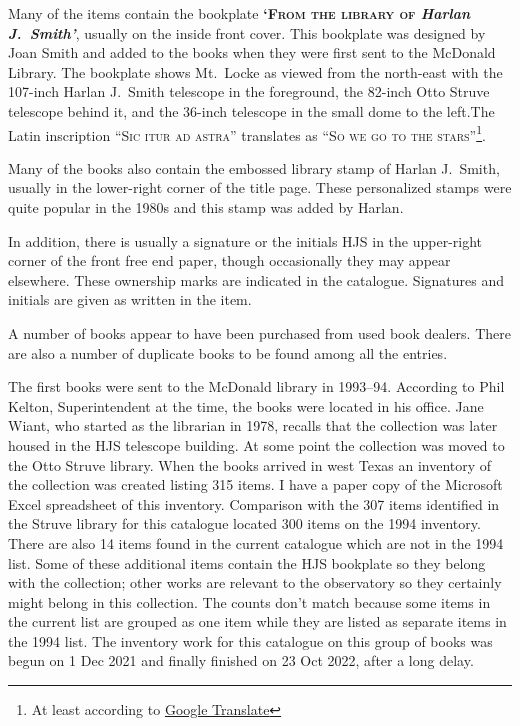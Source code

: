Many of the items contain the bookplate {\bfseries\textsc{`From the
    library of} \textit{Harlan J.~Smith'}}, usually on the inside
front cover. This bookplate was designed by Joan Smith and added to
the books when they were first sent to the McDonald Library. The
bookplate shows Mt.~Locke as viewed from the north-east with the
107-inch Harlan J.~Smith telescope in the foreground, the 82-inch Otto
Struve telescope behind it, and the 36-inch telescope in the small
dome to the left.The Latin inscription \textsc{``Sic itur ad astra''}
translates as \textsc{``So we go to the stars''}\footnote{At least
according to \href{https://translate.google.com}{Google Translate}}.

Many of the books also contain the embossed library stamp of Harlan
J.~Smith, usually in the lower-right corner of the title page. These
personalized stamps were quite popular in the 1980s and this stamp was
added by Harlan.

In addition, there is usually a signature or the initials
HJS in the upper-right corner of the front free end paper, though
occasionally they may appear elsewhere.  These ownership marks are
indicated in the catalogue.  Signatures and initials are given as
written in the item.

A number of books appear to have been purchased from used book
dealers.  There are also a number of duplicate books to be found among
all the entries.

The first books were sent to the McDonald library in
1993--94. According to Phil Kelton, Superintendent at the time, the
books were located in his office.  Jane Wiant, who started as the
librarian in 1978, recalls that the collection was later housed in the
HJS telescope building.  At some point the collection was moved to the
Otto Struve library.  When the books arrived in west Texas an
inventory of the collection was created listing 315 items. I have a
paper copy of the Microsoft Excel spreadsheet of this inventory.
Comparison with the 307 items identified in the Struve library for
this catalogue located 300 items on the 1994 inventory. There are also
14 items found in the current catalogue which are not in the 1994
list. Some of these additional items contain the HJS bookplate so they
belong with the collection; other works are relevant to the
observatory so they certainly might belong in this collection. The
counts don't match because some items in the current list are grouped
as one item while they are listed as separate items in the 1994 list.
The inventory work for this catalogue on this group of books was begun
on 1 Dec 2021 and finally finished on 23 Oct 2022, after a long delay.


